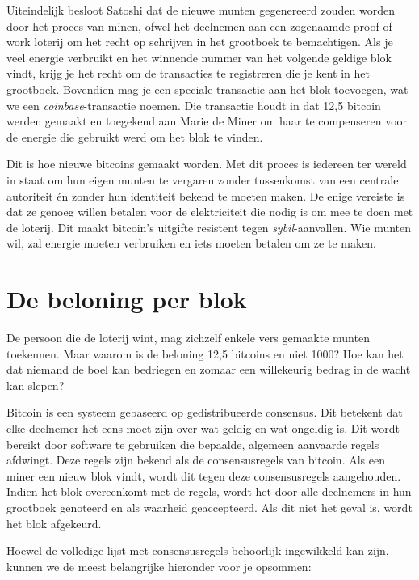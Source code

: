 Uiteindelijk besloot Satoshi dat de nieuwe munten gegenereerd zouden worden door het proces van minen, ofwel het deelnemen aan een zogenaamde proof-of-work loterij om het recht op schrijven in het grootboek te bemachtigen. Als je veel energie verbruikt en het winnende nummer van het volgende geldige blok vindt, krijg je het recht om de transacties te registreren die je kent in het grootboek. Bovendien mag je een speciale transactie aan het blok toevoegen, wat we een \textit{coinbase}-transactie noemen. Die transactie houdt in \textquotedbl{}dat 12,5 bitcoin werden gemaakt en toegekend aan Marie de Miner om haar te compenseren voor de energie die gebruikt werd om het blok te vinden.\textquotedbl{}

Dit is hoe nieuwe bitcoins \textquotedbl{}gemaakt\textquotedbl{} worden. Met dit proces is iedereen ter wereld in staat om hun eigen munten te vergaren zonder tussenkomst van een centrale autoriteit én zonder hun identiteit bekend te moeten maken. De enige vereiste is dat ze genoeg willen betalen voor de elektriciteit die nodig is om mee te doen met de loterij. Dit maakt bitcoin’s uitgifte resistent tegen \textit{sybil}-aanvallen. Wie munten wil, zal energie moeten verbruiken en iets moeten betalen om ze te maken.

\section{De beloning per blok}
De persoon die de loterij wint, mag zichzelf enkele vers gemaakte munten toekennen. Maar waarom is de beloning 12,5 bitcoins en niet 1000? Hoe kan het dat niemand de boel kan bedriegen en zomaar een willekeurig bedrag in de wacht kan slepen?

Bitcoin is een systeem gebaseerd op gedistribueerde consensus. Dit betekent dat elke deelnemer het eens moet zijn over wat geldig en wat ongeldig is. Dit wordt bereikt door software te gebruiken die bepaalde, algemeen aanvaarde regels afdwingt. Deze regels zijn bekend als de consensusregels van bitcoin. Als een miner een nieuw blok vindt, wordt dit tegen deze consensusregels aangehouden. Indien het blok overeenkomt met de regels, wordt het door alle deelnemers in hun grootboek genoteerd en als waarheid geaccepteerd. Als dit niet het geval is, wordt het blok afgekeurd.

Hoewel de volledige lijst met consensusregels behoorlijk ingewikkeld kan zijn, kunnen we de meest belangrijke hieronder voor je opsommen:

